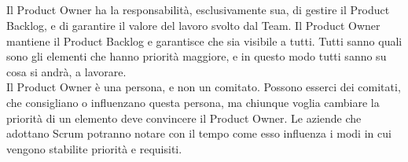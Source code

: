 \vspace{0.4cm}


\subsection*{\color{Blue}{IL PRODUCT OWNER}}
\label{sec:productowner}
Il Product Owner ha la responsabilit\`a, esclusivamente sua, di gestire il Product Backlog, e di garantire il valore del lavoro svolto dal Team. Il Product Owner mantiene il Product Backlog e garantisce che sia visibile a tutti. Tutti sanno quali sono gli elementi che hanno priorit\`a maggiore, e in questo modo tutti sanno su cosa si andr\`a, a lavorare. \\
Il Product Owner \`e  una persona, e non un comitato. Possono esserci dei comitati, che consigliano o influenzano questa persona, ma chiunque voglia cambiare la priorit\`a di un elemento deve convincere il Product Owner. Le aziende che adottano Scrum potranno notare con il tempo come esso influenza i modi in cui vengono stabilite priorit\`a e  requisiti. 

\vspace{0.4cm}


